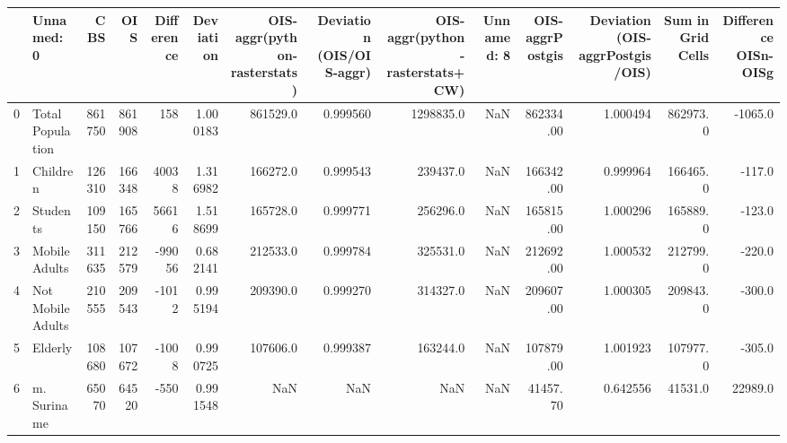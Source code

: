 \begin{tabular}{llrrrrrrrrrrrr}
\toprule
{} &         Unnamed: 0 &     CBS &     OIS &  Difference  &  Deviation &  OIS-aggr(python-rasterstats) &  Deviation (OIS/OIS-aggr) &  OIS-aggr(python-rasterstats+CW) &  Unnamed: 8 &  OIS-aggrPostgis &  Deviation (OIS-aggrPostgis/OIS) &  Sum in Grid Cells &  Difference OISn-OISg \\
\midrule
0  &   Total Population &  861750 &  861908 &          158 &   1.000183 &                      861529.0 &                  0.999560 &                        1298835.0 &         NaN &        862334.00 &                         1.000494 &           862973.0 &               -1065.0 \\
1  &           Children &  126310 &  166348 &        40038 &   1.316982 &                      166272.0 &                  0.999543 &                         239437.0 &         NaN &        166342.00 &                         0.999964 &           166465.0 &                -117.0 \\
2  &           Students &  109150 &  165766 &        56616 &   1.518699 &                      165728.0 &                  0.999771 &                         256296.0 &         NaN &        165815.00 &                         1.000296 &           165889.0 &                -123.0 \\
3  &      Mobile Adults &  311635 &  212579 &       -99056 &   0.682141 &                      212533.0 &                  0.999784 &                         325531.0 &         NaN &        212692.00 &                         1.000532 &           212799.0 &                -220.0 \\
4  &  Not Mobile Adults &  210555 &  209543 &        -1012 &   0.995194 &                      209390.0 &                  0.999270 &                         314327.0 &         NaN &        209607.00 &                         1.000305 &           209843.0 &                -300.0 \\
5  &            Elderly &  108680 &  107672 &        -1008 &   0.990725 &                      107606.0 &                  0.999387 &                         163244.0 &         NaN &        107879.00 &                         1.001923 &           107977.0 &                -305.0 \\
6  &        m. Suriname &   65070 &   64520 &         -550 &   0.991548 &                           NaN &                       NaN &                              NaN &         NaN &         41457.70 &                         0.642556 &            41531.0 &               22989.0 \\

\end{tabular}
